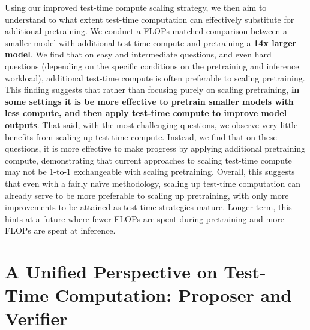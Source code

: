 Using our improved test-time compute scaling strategy, we then aim to understand to what extent test-time computation can effectively substitute for additional pretraining. We conduct a FLOPs-matched comparison between a smaller model with additional test-time compute and pretraining a \textbf{14x larger model}. We find that on easy and intermediate questions, and even hard questions (depending on the specific conditions on the pretraining and inference workload), additional test-time compute is often preferable to scaling pretraining. This finding suggests that rather than focusing purely on scaling pretraining, \textbf{in some settings it is be more effective to pretrain smaller models with less compute, and then apply test-time compute to improve model outputs}. That said, with the most challenging questions, we observe very little benefits from scaling up test-time compute. Instead, we find that on these questions, it is more effective to make progress by applying additional pretraining compute, demonstrating that current approaches to scaling test-time compute may not be 1-to-1 exchangeable with scaling pretraining. Overall, this suggests that even with a fairly na\"ive methodology, scaling up test-time computation can already serve to be more preferable to scaling up pretraining, with only more improvements to be attained as test-time strategies mature. Longer term, this hints at a future where fewer FLOPs are spent during pretraining and more FLOPs are spent at inference.

\vspace{-0.2cm}
\section{A Unified Perspective on Test-Time Computation: Proposer and Verifier}
\label{sec:unifying_perspective}
\vspace{-0.2cm}

